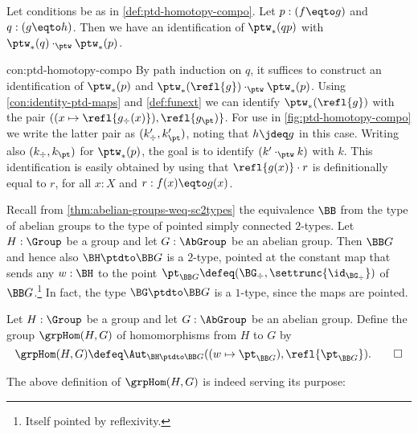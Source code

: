 \begin{construction}\label{con:ptd-homotopy-compo}
Let conditions be as in \cref{def:ptd-homotopy-compo}.
Let $p:(f\eqto g)$ and $q:(g\eqto h)$.
Then we have an identification of $\ptw_*(qp)$ with
$\ptw_*(q) \cdot_{\ptw} \ptw_*(p)$.
\end{construction}
\begin{implementation}{con:ptd-homotopy-compo}
By path induction on $q$, it suffices to construct an identification
of $\ptw_*(p)$ and $\ptw_*(\refl{g}) \cdot_{\ptw} \ptw_*(p)$.
Using \cref{con:identity-ptd-maps} and \cref{def:funext} we
can identify $\ptw_*(\refl{g})$ with the pair
$((x\mapsto\refl{g_\div(x)}),\refl{g_\pt)}$. 
For use in \cref{fig:ptd-homotopy-compo} we write the latter
pair as $(k'_\div,k'_\pt)$, noting that $h\jdeq g$ in this case.
Writing also $(k_\div,k_\pt)$ for $\ptw_*(p)$, the goal is to
identify $(k'\cdot_{\ptw} k)$ with $k$.
This identification is easily obtained by using
that $\refl{g(x)}\cdot r$ is definitionally equal to $r$,
for all $x:X$ and $r:f(x)\eqto g(x)$.
\end{implementation}

Recall from \cref{thm:abelian-groups-weq-sc2types} the equivalence
$\BB$ from the type of abelian groups to the type of pointed
simply connected $2$-types. Let $H:\Group$ be a group and let
$G:\AbGroup$ be an abelian group.
Then $\BB G$ and hence also $\BH\ptdto\BB G$ is a $2$-type, 
pointed at the constant map that sends any $w:\BH$ to the 
point $\pt_{\BB G}\defeq (\BG_\div,\settrunc{\id_{\BG_\div}})$ 
of $\BB G$.\footnote{Itself pointed by reflexivity.} In fact,
the type $\BG\ptdto\BB G$ is a $1$-type, since the maps are pointed.

\begin{definition}\label{def:AbHomgroup}
Let $H:\Group$ be a group and let $G:\AbGroup$ be an abelian group. 
Define the group $\grpHom(H,G)$ of homomorphisms from $H$ to $G$ by 
\[
\grpHom(H,G) \defeq \Aut_{\BH\ptdto\BB G}
((w \mapsto \pt_{\BB G}),\refl{\pt_{\BB G}}).\qedhere
\]
\end{definition}

The above definition of $\grpHom(H,G)$ is indeed serving its purpose:

